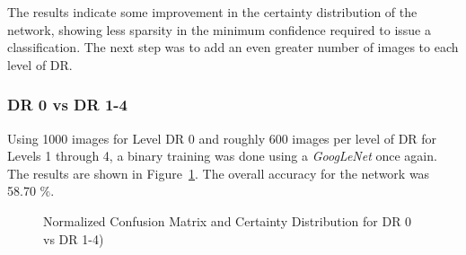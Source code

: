 \documentclass[letterpaper,12pt]{article}
\newcommand{\figref}[1]{Figure~\ref{#1}}
\begin{document}
The results indicate some improvement in the certainty distribution of the network, showing less sparsity in the minimum confidence required to issue a classification. The next step was to add an even greater number of images to each level of DR.

\subsubsection{DR 0 vs DR 1-4}

Using 1000 images for Level DR 0 and roughly 600 images per level of DR for Levels 1 through 4, a binary training was done using a \textit{GoogLeNet} once again. The results are shown in \figref{DR0_DR+}. The overall accuracy for the network was 58.70 $\%$.

\begin{figure}[htbp]
\begin{center}
\caption{Normalized Confusion Matrix and Certainty Distribution for DR 0 vs DR 1-4)}
\label{DR0_DR+}
\end{center}
\end{figure}
\end{document}
